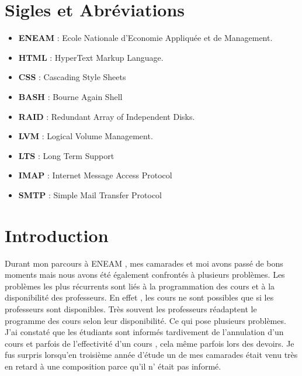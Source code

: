 \documentclass[a4paper,12pt,french]{report} %
\begin{document}
\chapter*{Sigles et Abréviations}
\begin{itemize}
\item[] \textbf{ENEAM} : Ecole Nationale d'Economie Appliquée et de Management. %
\item[] \textbf{HTML} : HyperText Markup Language. %
\item[] \textbf{CSS} : Cascading Style Sheets
\item[] \textbf{BASH} : Bourne Again Shell
\item[] \textbf{RAID} : Redundant Array of Independent Disks. %
\item[] \textbf{LVM} :  Logical Volume Management. %
\item[] \textbf{LTS} : Long Term Support
\item[] \textbf{IMAP} : Internet Message Access Protocol
\item[] \textbf{SMTP} : Simple Mail Transfer Protocol
\end{itemize}

\renewcommand{\contentsname}{Table des matières}

\tableofcontents
{}
\listoffigures
\onehalfspacing %
\clearpage

\chapter*{Introduction}
	Durant mon parcours à ENEAM \label{ref:eneam}, mes camarades et moi avons passé de bons moments mais nous avons été également confrontés à plusieurs problèmes. Les problèmes les plus récurrents sont liés à la programmation des cours et  à la disponibilité des professeurs. En effet , les cours ne sont possibles que si les professeurs sont disponibles. Très souvent les professeurs réadaptent le programme des cours selon leur disponibilité. Ce qui pose plusieurs problèmes. J'ai constaté que les étudiants sont informés tardivement de l'annulation d'un cours et parfois de l'effectivité d'un cours , cela même parfois lors des devoirs. Je fus surpris lorsqu'en troisième année d'étude un de mes camarades était venu très en retard à une composition parce qu'il n' était pas informé.
	
\end{document}
